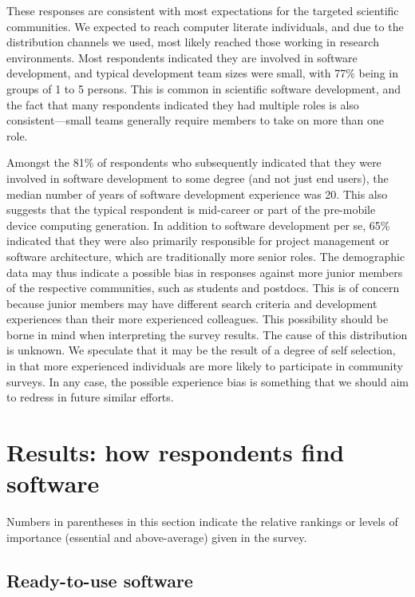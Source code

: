 \documentclass{casicswhitepaper}
\begin{document}
These responses are consistent with most expectations for the targeted scientific communities.  We expected to reach computer literate individuals, and due to the distribution channels we used, most likely reached those working in research environments.  Most respondents indicated they are involved in software development, and typical development team sizes were small, with 77\% being in groups of 1 to 5 persons.  This is common in scientific software development, and the fact that many respondents indicated they had multiple roles is also consistent---small teams generally require members to take on more than one role.

Amongst the 81\% of respondents who subsequently indicated that they were involved in software development to some degree (and not just end users), the median number of years of software development experience was 20. This also suggests that the typical respondent is mid-career or part of the pre-mobile device computing generation. In addition to software development per se, 65\% indicated that they were also primarily responsible for project management or software architecture, which are traditionally more senior roles.  The demographic data may thus indicate a possible bias in responses against more junior members of the respective communities, such as students and postdocs.  This is of concern because junior members may have different search criteria and development experiences than their more experienced colleagues. This possibility should be borne in mind when interpreting the survey results. The cause of this distribution is unknown.  We speculate that it may be the result of a degree of self selection, in that more experienced individuals are more likely to participate in community surveys.  In any case, the possible experience bias is something that we should aim to redress in future similar efforts.


\section{Results: how respondents find software}

Numbers in parentheses in this section indicate the relative rankings or levels of importance (essential and above-average) given in the survey.


\subsection{Ready-to-use software}
 
\end{document}
